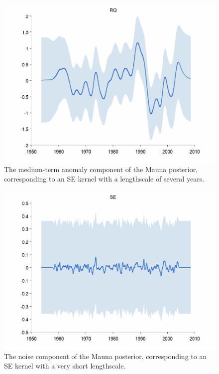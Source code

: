 \documentclass[twoside]{article}
\theoremstyle{definition}
\theoremstyle{remark}
\numberwithin{equation}{section}
\numberwithin{thm}{section}
\begin{document}
\begin{figure}
\includegraphics[width=\columnwidth]{../figures/decomposition/mauna_test_3}
\caption{The medium-term anomaly component of the Mauna posterior, corresponding to an SE kernel with a lengthscale of several years.}
\label{fig:mauna_decomp3}
\end{figure}

\begin{figure}
\includegraphics[width=\columnwidth]{../figures/decomposition/mauna_test_4}
\caption{The noise component of the Mauna posterior, corresponding to an SE kernel with a very short lengthscale.}
\label{fig:mauna_decomp4}
\end{figure}
\end{document}
